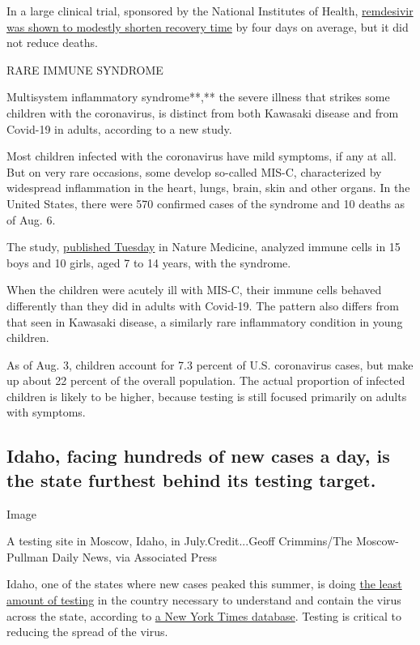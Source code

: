 In a large clinical trial, sponsored by the National Institutes of
Health,
\href{https://www.nytimes3xbfgragh.onion/2020/05/23/health/coronavirus-remdesivir.html}{remdesivir
was shown to modestly shorten recovery time} by four days on average,
but it did not reduce deaths.

RARE IMMUNE SYNDROME

Multisystem inflammatory syndrome**,** the severe illness that strikes
some children with the coronavirus, is distinct from both Kawasaki
disease and from Covid-19 in adults, according to a new study.

Most children infected with the coronavirus have mild symptoms, if any
at all. But on very rare occasions, some develop so-called MIS-C,
characterized by widespread inflammation in the heart, lungs, brain,
skin and other organs. In the United States, there were 570 confirmed
cases of the syndrome and 10 deaths as of Aug. 6.

The study,
\href{https://www.nature.com/articles/s41591-020-1054-6}{published
Tuesday} in Nature Medicine, analyzed immune cells in 15 boys and 10
girls, aged 7 to 14 years, with the syndrome.

When the children were acutely ill with MIS-C, their immune cells
behaved differently than they did in adults with Covid-19. The pattern
also differs from that seen in Kawasaki disease, a similarly rare
inflammatory condition in young children.

As of Aug. 3, children account for 7.3 percent of U.S. coronavirus
cases, but make up about 22 percent of the overall population. The
actual proportion of infected children is likely to be higher, because
testing is still focused primarily on adults with symptoms.

\hypertarget{idaho-facing-hundreds-of-new-cases-a-day-is-the-state-furthest-behind-its-testing-target}{%
\subsection{Idaho, facing hundreds of new cases a day, is the state
furthest behind its testing
target.}\label{idaho-facing-hundreds-of-new-cases-a-day-is-the-state-furthest-behind-its-testing-target}}

Image

A testing site in Moscow, Idaho, in July.Credit...Geoff Crimmins/The
Moscow-Pullman Daily News, via Associated Press

Idaho, one of the states where new cases peaked this summer, is doing
\href{https://www.nytimes3xbfgragh.onion/interactive/2020/us/coronavirus-testing.html}{the
least amount of testing} in the country necessary to understand and
contain the virus across the state, according to
\href{https://www.nytimes3xbfgragh.onion/interactive/2020/us/coronavirus-testing.html}{a
New York Times database}. Testing is critical to reducing the spread of
the virus.

